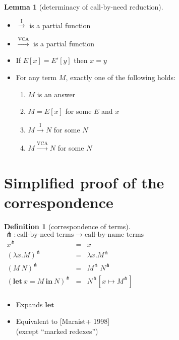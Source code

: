 \documentclass[dvipdfmx,cjk,xcolor=dvipsnames,envcountsect,notheorems,12pt]{beamer}
\theoremstyle{definition}
\newtheorem{definition}{Definition}
\newtheorem{lemma}{Lemma}
\newcommand{\LET}[3]{\mathbf{let}~#1=#2~\mathbf{in}~#3}
\newcommand{\EXPANDLET}[1]{#1^\pitchfork}
\newcommand{\CALLBYNEEDI}{\xrightarrow{\mathrm{I}}}
\newcommand{\CALLBYNEEDVCA}{\xrightarrow{\mathrm{VCA}}}
\begin{document}
\begin{frame}
	\begin{lemma}[determinacy of call-by-need reduction]
	\begin{itemize}
		\item $\CALLBYNEEDI$ is a partial function
		\item $\CALLBYNEEDVCA$ is a partial function
		\item If $E[x]=E'[y]$ then $x=y$
		\item For any term $M$, \alert{exactly one} of the following holds:
			\begin{enumerate}
				\item $M$ is an answer
				\item $M=E[x]$ for some $E$ and $x$
				\item $M\CALLBYNEEDI N$ for some $N$
				\item $M\CALLBYNEEDVCA N$ for some $N$
			\end{enumerate}
	\end{itemize}
	\end{lemma}
\end{frame}

\section{Simplified proof of the correspondence}

\begin{frame}[fragile]
	\Large
	\begin{definition}[correspondence of terms]
		$\pitchfork : \mbox{call-by-need terms} \rightarrow \mbox{call-by-name terms}$ \\
	$\begin{array}{rcl}
		\EXPANDLET{x} & = & x \\
		\EXPANDLET{(\lambda x. M)} & = & \lambda x. \EXPANDLET{M} \\
		\EXPANDLET{(M~N)} & = & \EXPANDLET{M}~\EXPANDLET{N} \\
		\EXPANDLET{(\LET{x}{M}{N})} & = & \EXPANDLET{N}[x \mapsto \EXPANDLET{M}] \\
	\end{array}$
	\end{definition}
	\begin{itemize}
		\item Expands $\mathbf{let}$
		\item Equivalent to [Maraist+ 1998] \\(except ``marked redexes'')
	\end{itemize}
\end{frame}
\end{document}

